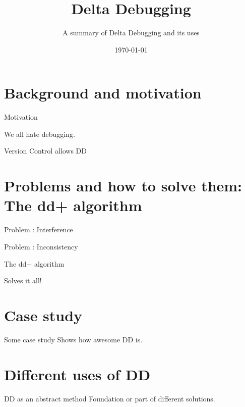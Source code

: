 


\title[Delta Debugging]{Delta Debugging}
\subtitle{A summary of Delta Debugging and its uses}
\date{\today}


\titleframe

\section{Background and motivation}
\begin{frame}{Motivation}
	\begin{center}
		We all hate debugging.
	\end{center}
\end{frame}

\begin{frame}{Version Control allows DD}
\end{frame}


\section{Problems and how to solve them: The dd+ algorithm}
\begin{frame}{Problem : Interference}
\end{frame}

\begin{frame}{Problem : Inconsistency}
	
\end{frame}

\begin{frame}{The dd+ algorithm}
	\begin{center}
		Solves it all!
	\end{center}
\end{frame}

\section{Case study}
\begin{frame}{Some case study}
	Shows how awesome DD is.
\end{frame}

\section{Different uses of DD}
\begin{frame}{DD as an abstract method}
	Foundation or part of different solutions.
\end{frame}

